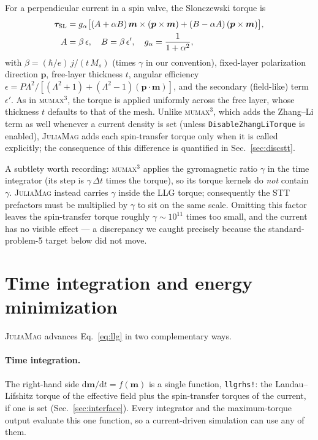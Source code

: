 \documentclass{article}      %
\newcommand{\JuliaMag}{\textsc{JuliaMag}}
\newcommand{\mumax}{\textsc{mumax}$^3$}
\newcommand{\vm}{\bm{m}}
\begin{document}
For a perpendicular current in a spin valve, the Slonczewski torque is
%
\begin{align}
  \bm{\tau}_{\mathrm{SL}} &= g_\alpha\big[(A+\alpha B)\,\vm\times(\bm{p}\times\vm)
                             + (B-\alpha A)\,(\bm{p}\times\vm)\big], \\
  A &= \beta\,\epsilon,\quad B = \beta\,\epsilon',\quad
      g_\alpha = \frac{1}{1+\alpha^2}, \notag
\end{align}
%
with $\beta = (\hbar/e)\,j/(t\,M_s)$ (times $\gamma$ in our convention), fixed-layer
polarization direction $\bm{p}$, free-layer thickness $t$, angular efficiency
$\epsilon = P\Lambda^2/[(\Lambda^2+1)+(\Lambda^2-1)(\bm{p}\cdot\vm)]$, and the
secondary (field-like) term $\epsilon'$. As in \mumax, the torque is applied
uniformly across the free layer, whose thickness $t$ defaults to that of the
mesh. Unlike \mumax, which adds the Zhang--Li term as well whenever a current
density is set (unless \texttt{DisableZhangLiTorque} is enabled), \JuliaMag{}
adds each spin-transfer torque only when it is called explicitly; the
consequence of this difference is quantified in Sec.~\ref{sec:discstt}.

A subtlety worth recording: \mumax{} applies the gyromagnetic ratio $\gamma$ in
the time integrator (its step is $\gamma\,\Delta t$ times the torque), so its
torque kernels do \emph{not} contain $\gamma$. \JuliaMag{} instead carries
$\gamma$ inside the LLG torque; consequently the STT prefactors must be multiplied
by $\gamma$ to sit on the same scale. Omitting this factor leaves the
spin-transfer torque roughly $\gamma \sim 10^{11}$ times too small, and the
current has no visible effect --- a discrepancy we caught precisely because the
standard-problem-5 target below did not move.

\section{Time integration and energy minimization}
\label{sec:solvers}

\JuliaMag{} advances Eq.~\eqref{eq:llg} in two complementary ways.

\paragraph{Time integration.}
The right-hand side $\mathrm{d}\vm/\mathrm{d}t = f(\vm)$ is a single function,
\texttt{llgrhs!}: the Landau--Lifshitz torque of the effective field plus the
spin-transfer torques of the current, if one is set (Sec.~\ref{sec:interface}).
Every integrator and the maximum-torque output evaluate this one function, so a
current-driven simulation can use any of them.
\end{document}
